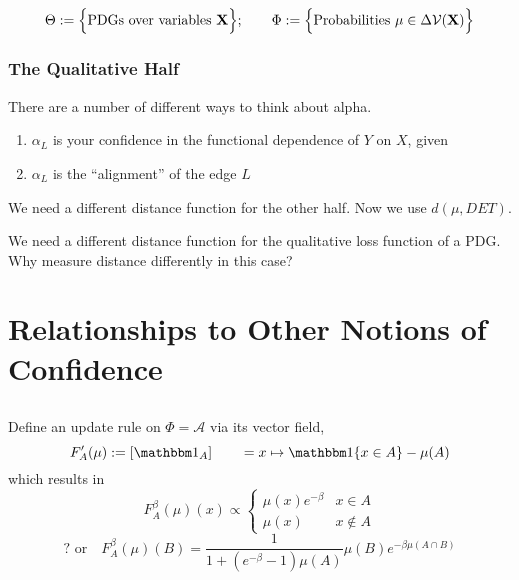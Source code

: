 \documentclass{article}
\begin{document}
\subsubsection{}
\begin{align*}
    \Theta :=
        \Big\{
        \text{PDGs over variables } \mathbf{X}
        \Big\}; \qquad
    \Phi := \Big\{
        \text{Probabilities}~ \mu \in \Delta \mathcal V(\mathbf{X})
        \Big\}
\end{align*}


\subsubsection*{The Qualitative Half}


There are a number of different ways to think about alpha.
\begin{enumerate}[nosep]
    \item $\alpha_L$ is your confidence in the functional dependence of $Y$ on $X$, given
    \item $\alpha_L$ is the ``alignment'' of the edge $L$
\end{enumerate}

We need a different distance function for the other half. Now we use
$d(\mu, DET)$.

%

We need a different distance function for the qualitative loss function of a PDG.
Why measure distance differently in this case?


\section{Relationships to Other Notions of Confidence}

\subsection{}

Define an update rule on $\Phi = \mathcal A$ via its vector field,
\[
    F'_A(\mu) := [ \mathbbm 1_{A} ]
     \qquad = x \mapsto \mathbbm1\{x \in A\} - \mu(A)
\]
which results in
\[
    F_A^\beta(\mu)(x) \propto
    \begin{cases}
        \mu(x) e^{-\beta} & x \in A \\
        \mu(x) & x \notin A
    \end{cases}
\]
\[\text{? or}\quad
    F_A^\beta(\mu) (B) =
    \frac{1}{1 + (e^{-\beta}-1) \mu(A) } \mu(B) e^{-\beta \mu(A \cap B)}
\]
\end{document}
